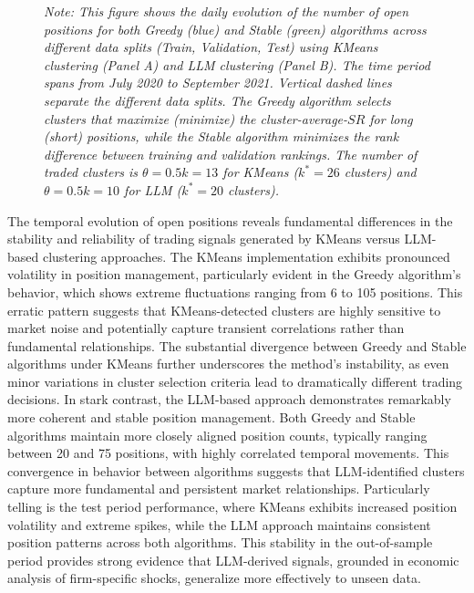 \begin{figure}[htbp]
\vspace{0.2cm}
\begin{minipage}{\textwidth}
\setlength{\parindent}{0pt}
{\footnotesize\textit{Note: 
This figure shows the daily evolution of the number of open positions for both Greedy (blue) and Stable (green) algorithms across different data splits (Train, Validation, Test) using KMeans clustering (Panel A) and LLM clustering (Panel B). The time period spans from July 2020 to September 2021. Vertical dashed lines separate the different data splits. The Greedy algorithm selects clusters that maximize (minimize) the cluster-average-$SR$ for long (short) positions, while the Stable algorithm minimizes the rank difference between training and validation rankings. The number of traded clusters is $\theta = 0.5k=13$ for KMeans ($k^*=26$ clusters) and $\theta = 0.5k=10$ for LLM ($k^*=20$ clusters).
}}
\end{minipage}
\end{figure}

The temporal evolution of open positions reveals fundamental differences in the stability and reliability of trading signals generated by KMeans versus LLM-based clustering approaches. The KMeans implementation exhibits pronounced volatility in position management, particularly evident in the Greedy algorithm's behavior, which shows extreme fluctuations ranging from 6 to 105 positions. This erratic pattern suggests that KMeans-detected clusters are highly sensitive to market noise and potentially capture transient correlations rather than fundamental relationships. The substantial divergence between Greedy and Stable algorithms under KMeans further underscores the method's instability, as even minor variations in cluster selection criteria lead to dramatically different trading decisions.
In stark contrast, the LLM-based approach demonstrates remarkably more coherent and stable position management. Both Greedy and Stable algorithms maintain more closely aligned position counts, typically ranging between 20 and 75 positions, with highly correlated temporal movements. This convergence in behavior between algorithms suggests that LLM-identified clusters capture more fundamental and persistent market relationships. Particularly telling is the test period performance, where KMeans exhibits increased position volatility and extreme spikes, while the LLM approach maintains consistent position patterns across both algorithms. This stability in the out-of-sample period provides strong evidence that LLM-derived signals, grounded in economic analysis of firm-specific shocks, generalize more effectively to unseen data.

